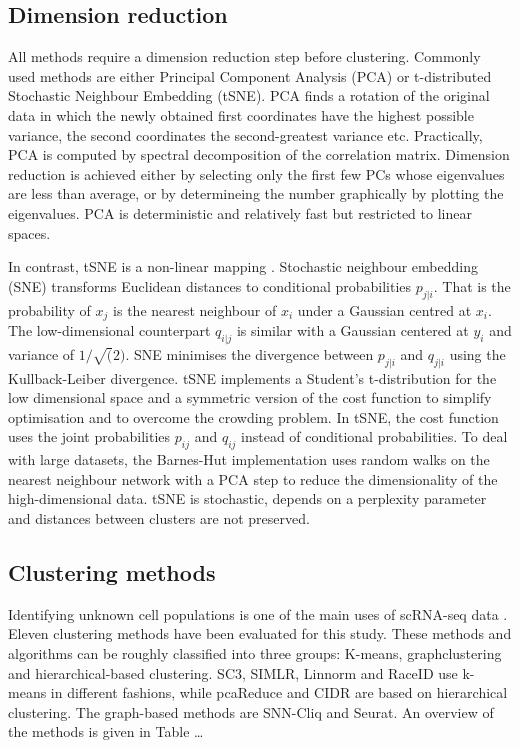 \documentclass[11pt, a4paper]{article}\usepackage[]{graphicx}\usepackage[]{color}
\begin{document}
\subsection{Dimension reduction}
All methods require a dimension reduction step before clustering. Commonly used methods are either Principal Component Analysis (PCA) or t-distributed Stochastic Neighbour Embedding (tSNE). PCA finds a rotation of the original data in which the newly obtained first coordinates have the highest possible variance, the second coordinates the second-greatest variance etc. Practically, PCA is computed by spectral decomposition of the correlation matrix. Dimension reduction is achieved either by selecting only the first few PCs whose eigenvalues are less than average, or by determineing the number graphically by plotting the eigenvalues. PCA is deterministic and relatively fast but restricted to linear spaces.

In contrast,  tSNE is a non-linear mapping \citep{van2013barnes}. Stochastic neighbour embedding (SNE) transforms Euclidean distances to conditional probabilities $p_{j|i}$. That is the probability of \(x_j\) is the nearest neighbour of $x_i$ under a Gaussian centred at $x_i$. The low-dimensional counterpart $q_{i|j}$ is similar with a Gaussian centered at $y_i$ and variance of $1/\sqrt(2)$. SNE minimises the divergence between $p_{j|i}$ and $q_{j|i}$ using the Kullback-Leiber divergence. tSNE implements a Student's t-distribution for the low dimensional space and a symmetric version of the cost function to simplify optimisation and to overcome the crowding problem. In tSNE, the cost function uses the joint probabilities $p_{ij}$ and $q_{ij}$ instead of conditional probabilities. To deal with large datasets, the Barnes-Hut implementation uses random walks on the nearest neighbour network with a PCA step to reduce the dimensionality of the high-dimensional data. tSNE is stochastic, depends on a perplexity parameter and distances between clusters are not preserved. 
\subsection{Clustering methods}
Identifying unknown cell populations is one of the main uses of scRNA-seq data \citep{andrews2017identifying}. Eleven clustering methods have been evaluated for this study. These methods and algorithms can be roughly classified into three groups: K-means, graphclustering and hierarchical-based clustering. 
SC3, SIMLR, Linnorm and RaceID use k-means in different fashions, while pcaReduce and CIDR are based on hierarchical clustering. The graph-based methods are SNN-Cliq and Seurat. An overview of the methods is given in Table \dots
\end{document}
